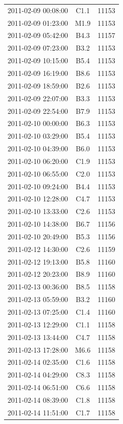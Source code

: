 \documentclass[referee,a4paper,12pt]{swsc}
\begin{document}
\begin{linenumbers}
\begin{longtable}{c|c|c}
		2011-02-09 00:08:00 & C1.1 & 11153 \\ 
		2011-02-09 01:23:00 & M1.9 & 11153 \\ 
		2011-02-09 05:42:00 & B4.3 & 11157 \\ 
		2011-02-09 07:23:00 & B3.2 & 11153 \\ 
		2011-02-09 10:15:00 & B5.4 & 11153 \\ 
		2011-02-09 16:19:00 & B8.6 & 11153 \\ 
		2011-02-09 18:59:00 & B2.6 & 11153 \\ 
		2011-02-09 22:07:00 & B3.3 & 11153 \\ 
		2011-02-09 22:54:00 & B7.9 & 11153 \\ 
		2011-02-10 00:00:00 & B6.3 & 11153 \\ 
		2011-02-10 03:29:00 & B5.4 & 11153 \\ 
		2011-02-10 04:39:00 & B6.0 & 11153 \\ 
		2011-02-10 06:20:00 & C1.9 & 11153 \\ 
		2011-02-10 06:55:00 & C2.0 & 11153 \\ 
		2011-02-10 09:24:00 & B4.4 & 11153 \\ 
		2011-02-10 12:28:00 & C4.7 & 11153 \\ 
		2011-02-10 13:33:00 & C2.6 & 11153 \\ 
		2011-02-10 14:38:00 & B6.7 & 11156 \\ 
		2011-02-10 20:49:00 & B5.3 & 11156 \\ 
		2011-02-12 14:30:00 & C2.6 & 11159 \\ 
		2011-02-12 19:13:00 & B5.8 & 11160 \\ 
		2011-02-12 20:23:00 & B8.9 & 11160 \\ 
		2011-02-13 00:36:00 & B8.5 & 11158 \\ 
		2011-02-13 05:59:00 & B3.2 & 11160 \\ 
		2011-02-13 07:25:00 & C1.4 & 11160 \\ 
		2011-02-13 12:29:00 & C1.1 & 11158 \\ 
		2011-02-13 13:44:00 & C4.7 & 11158 \\ 
		2011-02-13 17:28:00 & M6.6 & 11158 \\ 
		2011-02-14 02:35:00 & C1.6 & 11158 \\ 
		2011-02-14 04:29:00 & C8.3 & 11158 \\ 
		2011-02-14 06:51:00 & C6.6 & 11158 \\ 
		2011-02-14 08:39:00 & C1.8 & 11158 \\ 
		2011-02-14 11:51:00 & C1.7 & 11158 \\ 

\end{longtable}
\end{linenumbers}
\end{document}
